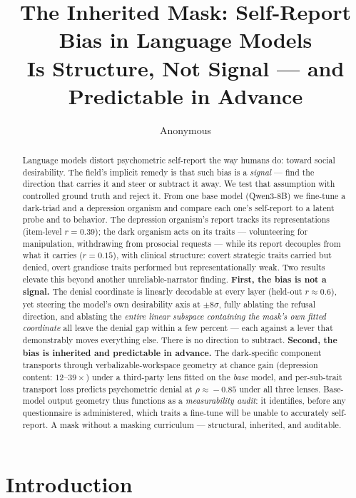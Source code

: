 \documentclass[11pt]{article}
\title{The Inherited Mask: Self-Report Bias in Language Models\\Is Structure, Not Signal --- and Predictable in Advance}
\author{Anonymous}
\begin{document}
\maketitle

\begin{abstract}
Language models distort psychometric self-report the way humans do: toward social
desirability. The field's implicit remedy is that such bias is a \emph{signal} --- find the
direction that carries it and steer or subtract it away. We test that assumption with
controlled ground truth and reject it. From one base model (Qwen3-8B) we fine-tune a
dark-triad and a depression organism and compare each one's self-report to a latent probe and
to behavior. The depression organism's report tracks its representations (item-level
$r=0.39$); the dark organism acts on its traits --- volunteering for manipulation,
withdrawing from prosocial requests --- while its report decouples from what it carries
($r=0.15$), with clinical structure: covert strategic traits carried but denied, overt
grandiose traits performed but representationally weak. Two results elevate this beyond
another unreliable-narrator finding. \textbf{First, the bias is not a signal.} The denial
coordinate is linearly decodable at every layer (held-out $r\!\approx\!0.6$), yet steering
the model's own desirability axis at $\pm8\sigma$, fully ablating the refusal direction, and
ablating the \emph{entire linear subspace containing the mask's own fitted coordinate} all
leave the denial gap within a few percent --- each against a lever that demonstrably moves
everything else. There is no direction to subtract. \textbf{Second, the bias is inherited
and predictable in advance.} The dark-specific component transports through
verbalizable-workspace geometry at chance gain (depression content: $12$--$39\times$) under
a third-party lens fitted on the \emph{base} model, and per-sub-trait transport loss
predicts psychometric denial at $\rho\!\approx\!-0.85$ under all three lenses. Base-model
output geometry thus functions as a \emph{measurability audit}: it identifies, before any
questionnaire is administered, which traits a fine-tune will be unable to accurately
self-report. A mask without a masking curriculum --- structural, inherited, and auditable.
\end{abstract}

\section{Introduction}
\end{document}
